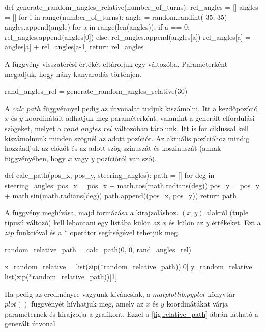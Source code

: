 \begin{python}
def generate_random_angles_relative(number_of_turns):
        rel_angles = []
        angles = []
        for i in range(number_of_turns):
            angle = random.randint(-35, 35)
            angles.append(angle)
        for a in range(len(angles)):
            if a == 0:
                rel_angles.append(angles[0])
            else:
                rel_angles.append(angles[a])
                rel_angles[a] = angles[a] + rel_angles[a-1]
        return rel_angles
\end{python}

A függvény visszatérési értékét eltároljuk egy változóba. Paraméterként megadjuk, hogy hány kanyarodás történjen.

\begin{python}
rand_angles_rel = generate_random_angles_relative(30)
\end{python}

A $calc\_path$ függvénnyel pedig az útvonalat tudjuk kiszámolni. Itt a kezdőpozíció $ x $ és $ y $ koordinátáit adhatjuk meg paraméterként, valamint a generált elfordulási szögeket, melyet a $rand\_angles\_rel$ változóban tárolunk. Itt is for ciklussal kell kiszámolnunk minden szögnél az adott pozíciót. Az aktuális pozícióhoz mindig hozzáadjuk az előzőt és az adott szög szinuszát és koszinuszát (annak függvényében, hogy $ x $ vagy $ y $ pozícióról van szó). 

\begin{python}
def calc_path(pos_x, pos_y, steering_angles):
        path = []
        for deg in steering_angles:
            pos_x = pos_x + math.cos(math.radians(deg))
            pos_y = pos_y + math.sin(math.radians(deg))
            path.append((pos_x, pos_y))
        return path
\end{python}

A függvény meghívása, majd formázása a kirajzoláshoz. $ (x, y) $ alakról (tuple típusú változó) kell lebontani egy listába külön az $ x $ és külön az $ y $ értékeket. Ezt a $ zip $ funkcióval és a $ * $ operátor segítségével tehetjük meg.

\begin{python}
random_relative_path = calc_path(0, 0, rand_angles_rel)

x_random_relative = list(zip(*random_relative_path))[0]
y_random_relative = list(zip(*random_relative_path))[1]
\end{python}

Ha pedig az eredményre vagyunk kíváncsiak, a $ matplotlib.pyplot $ könyvtár  $ plot() $ függvényét hívhatjuk meg, amely az $ x $ és $ y $ koordinátákat várja paraméternek és kirajzolja a grafikont. Ezzel a \ref{fig:relative_path} ábrán látható a generált útvonal.

